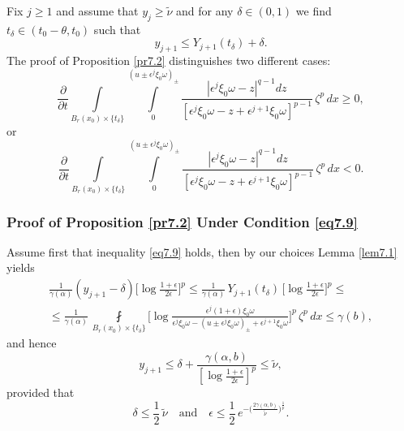 \documentclass[a4paper,11pt,fullpage]{article}
\numberwithin{equation}{section}
\begin{document}
Fix $j\geqslant 1$ and assume that $y_j\geqslant \tilde{\nu}$ and for any $\delta\in (0, 1)$ we find $t_\delta \in (t_0-\theta, t_0)$ such that
$$y_{j+1}\leqslant Y_{j+1}(t_\delta)+\delta.$$
The proof of Proposition \ref{pr7.2} distinguishes two different cases:
\begin{equation}\label{eq7.9}
\frac{\partial}{\partial t}\int\limits_{B_r(x_0)\times\{t_\delta\}}\int\limits^{(u\pm\epsilon^j\xi_0\omega)_{\pm}}_0\frac{|\epsilon^j\xi_0\omega-z|^{q-1} dz}{[\epsilon^j\xi_0\omega-z+\epsilon^{j+1}\xi_0\omega]^{p-1}}\,\zeta^p\,dx \geqslant 0,
\end{equation}
or
\begin{equation}\label{eq7.10}
\frac{\partial}{\partial t}\int\limits_{B_r(x_0)\times\{t_\delta\}}\int\limits^{(u\pm\epsilon^j\xi_0\omega)_{\pm}}_0\frac{|\epsilon^j\xi_0\omega-z|^{q-1} dz}{[\epsilon^j\xi_0\omega-z+\epsilon^{j+1}\xi_0\omega]^{p-1}}\,\zeta^p\,dx < 0.
\end{equation}

\subsubsection{Proof of Proposition \ref{pr7.2} Under Condition \eqref{eq7.9}}
Assume first that inequality \eqref{eq7.9} holds, then by our choices Lemma \ref{lem7.1} yields
\begin{multline*}
\frac{1}{\gamma(\alpha)}(y_{j+1}-\delta)\Big[\log\frac{1+\epsilon}{2\epsilon}\Big]^p\leqslant
\frac{1}{\gamma(\alpha)}\,Y_{j+1}(t_\delta)\,\Big[\log\frac{1+\epsilon}{2\epsilon}\Big]^p\leqslant\\\leqslant
\frac{1}{\gamma(\alpha)}\,\fint\limits_{B_r(x_0)\times\{t_\delta\}}
\Big[\log\frac{\epsilon^j(1+\epsilon)\xi_0\omega}{\epsilon^j\xi_0\omega-(u\pm\epsilon^j\xi_0\omega)_{\pm}+
\epsilon^{j+1}\xi_0\omega}\Big]^p\,
\zeta^p\,dx\leqslant \gamma(b),
\end{multline*}
and hence
\begin{equation}\label{eq7.11}
y_{j+1}\leqslant \delta+\frac{\gamma(\alpha, b)}{[\log\frac{1+\epsilon}{2\epsilon}]^p}\leqslant \tilde{\nu},
\end{equation}
provided that
$$\delta\leqslant \frac{1}{2}\,\tilde{\nu}\quad \text{and}\quad \epsilon \leqslant \frac{1}{2}\,e^{-\big(\frac{2\gamma(\alpha, b)}{\tilde{\nu}}\big)^{\frac{1}{p}}}.$$
\end{document}
